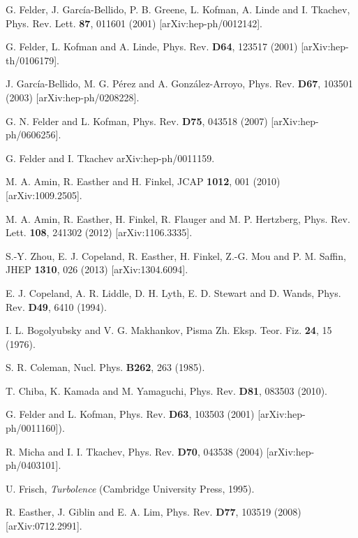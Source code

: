 \documentclass[11pt,a4paper,twoside]{book}
\begin{document}
\begin{thebibliography}{2}
	 G. Felder, J. Garc\'{i}a-Bellido, P. B. Greene, L. Kofman, A. Linde and I. Tkachev, Phys. Rev. Lett. \textbf{87}, 011601 (2001) [arXiv:hep-ph/0012142].
	
	 G. Felder, L. Kofman and A. Linde, Phys. Rev. \textbf{D64}, 123517 (2001) [arXiv:hep-th/0106179].
	
	 J. Garc\'{i}a-Bellido, M. G. P\'{e}rez and A. Gonz\'{a}lez-Arroyo, Phys. Rev. \textbf{D67}, 103501 (2003) [arXiv:hep-ph/0208228].
	
	 G. N. Felder and L. Kofman, Phys. Rev. \textbf{D75}, 043518 (2007) [arXiv:hep-ph/0606256].
	
	 G. Felder and I. Tkachev arXiv:hep-ph/0011159.
	
	 M. A. Amin, R. Easther and H. Finkel, JCAP \textbf{1012}, 001 (2010) [arXiv:1009.2505].
	
	 M. A. Amin, R. Easther, H. Finkel, R. Flauger and M. P. Hertzberg, Phys. Rev. Lett. \textbf{108}, 241302 (2012) [arXiv:1106.3335].
	
	 S.-Y. Zhou, E. J. Copeland, R. Easther, H. Finkel, Z.-G. Mou and P. M. Saffin, JHEP \textbf{1310}, 026 (2013) [arXiv:1304.6094].
	
	 E. J. Copeland, A. R. Liddle, D. H. Lyth, E. D. Stewart and D. Wands, Phys. Rev. \textbf{D49}, 6410 (1994).
	
	 I. L. Bogolyubsky and V. G. Makhankov, Pisma Zh. Eksp. Teor. Fiz. \textbf{24}, 15 (1976).

	 S. R. Coleman, Nucl. Phys. \textbf{B262}, 263 (1985). 	

	T. Chiba, K. Kamada and M. Yamaguchi, Phys. Rev. \textbf{D81}, 083503 (2010).	
	
	 G. Felder and L. Kofman, Phys. Rev. \textbf{D63}, 103503 (2001) [arXiv:hep-ph/0011160]).
	
	 R. Micha and I. I. Tkachev, Phys. Rev. \textbf{D70}, 043538 (2004) [arXiv:hep-ph/0403101].
	
	 U. Frisch, \textit{Turbolence} (Cambridge University Press, 1995).
	
	 R. Easther, J. Giblin and E. A. Lim, Phys. Rev. \textbf{D77}, 103519 (2008) [arXiv:0712.2991].
	

\end{thebibliography}
\end{document}
